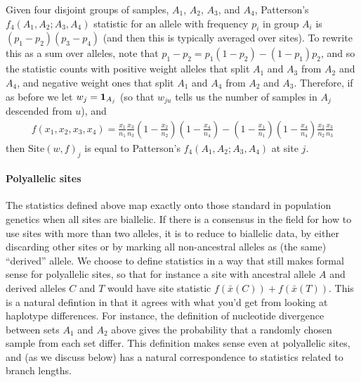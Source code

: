 \documentclass{article}
\newcommand{\site}{\mbox{Site}} %
\newcommand{\iw}{w} %
\newcommand{\aw}{{\bar x}} %
\begin{document}
\begin{example}[Patterson's $f_4$]
    Given four disjoint groups of samples, $A_1$, $A_2$, $A_3$, and $A_4$,
    Patterson's $f_4(A_1, A_2; A_3, A_4)$ statistic for an allele with frequency $p_i$ in group $A_i$
    is $(p_1 - p_2)(p_3 - p_4)$ (and then this is typically averaged over sites).
    To rewrite this as a sum over alleles, note that 
    $p_1 - p_2 = p_1 (1 - p_2) - (1 - p_1) p_2$,
    and so the statistic counts with positive weight
    alleles that split $A_1$ and $A_3$ from $A_2$ and $A_4$,
    and negative weight ones that split $A_1$ and $A_4$ from $A_2$ and $A_3$.
    Therefore, if as before we 
    let $\iw_j = \bone_{A_j}$
    (so that $\iw_{ju}$ tells us the number of samples in $A_j$ descended from $u$),
    and
    \begin{align*}
        f(x_1, x_2, x_3, x_4)
        =
        \frac{x_1}{n_1}
        \frac{x_3}{n_3}
        \left(1 - \frac{x_2}{n_2}\right)
        \left(1 - \frac{x_4}{n_4}\right)
        -
        \left(1 - \frac{x_1}{n_1}\right)
        \left(1 - \frac{x_4}{n_4}\right)
        \frac{x_2}{n_2}
        \frac{x_3}{n_3}
    \end{align*}
    then $\site(\iw, f)_j$ is equal to Patterson's $f_4(A_1, A_2; A_3, A_4)$
    at site $j$.
\end{example}

\paragraph{Polyallelic sites}
The statistics defined above map exactly onto those standard in population genetics
when all sites are biallelic. 
If there is a consensus in the field
for how to use sites with more than two alleles,
it is to reduce to biallelic data, by either discarding other sites
or by marking all non-ancestral alleles as (the same) ``derived'' allele.
We choose to define statistics in a way that still makes formal sense for polyallelic sites,
so that for instance a site with ancestral allele $A$ and derived alleles $C$ and $T$
would have site statistic $f(\aw(C)) + f(\aw(T))$.
This is a natural defintion in that it agrees with what you'd get
from looking at haplotype differences.
For instance, the definition of nucleotide divergence between sets $A_1$ and $A_2$ above
gives the probability that a randomly chosen sample from each set differ.
This definition makes sense even at polyallelic sites,
and (as we discuss below) has a natural correspondence to statistics related to branch lengths.
\end{document}
